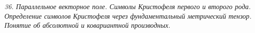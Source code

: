 \emph{36. Параллельное векторное поле. Символы Кристофеля первого и второго
рода. Определение символов Кристофеля через фундаментальный метрический
тензор. Понятие об абсолютной и ковариантной производных.}

\newpage
